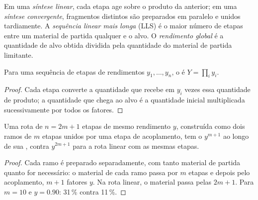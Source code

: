 \begin{definition}\label{def:b3:total-synthesis:architecture}
Em uma \emph{síntese linear}, cada etapa age sobre o
produto da anterior; em uma \emph{síntese convergente},
fragmentos distintos são preparados em paralelo e unidos tardiamente. A
\emph{sequência linear mais longa} (LLS) é o
maior número de etapas entre um material de partida qualquer e o alvo. O
\emph{rendimento global} é a quantidade de alvo obtida
dividida pela quantidade do material de partida limitante.
\end{definition}

\begin{proposition}\label{prop:b3:total-synthesis:overall-yield}
Para uma sequência de etapas de rendimentos $y_1, \dots, y_n$, o  é $Y = \prod_i y_i$.
\end{proposition}

\begin{proof}
Cada etapa converte a quantidade que recebe em $y_i$ vezes essa quantidade de produto; a
quantidade que chega ao alvo é a quantidade inicial multiplicada sucessivamente por todos os
fatores.
\end{proof}

\begin{proposition}[Convergência]\label{prop:b3:total-synthesis:convergent}
Uma rota de $n = 2m + 1$ etapas de mesmo rendimento $y$, construída como dois ramos de $m$ etapas unidos por
uma etapa de acoplamento, tem o  $y^{m+1}$ ao longo de sua ,
contra $y^{2m+1}$ para a rota linear com as mesmas etapas.
\end{proposition}

\begin{proof}
Cada ramo é preparado separadamente, com tanto material de partida quanto for necessário: o
material de cada ramo passa por $m$ etapas e depois pelo acoplamento, $m + 1$
fatores $y$. Na rota linear, o material passa pelas $2m + 1$. Para $m = 10$
e $y = 0.90$: 31\,\% contra 11\,\%.
\end{proof}

